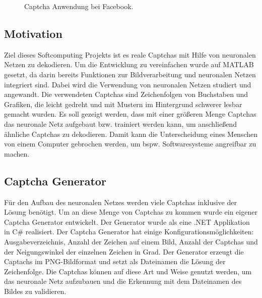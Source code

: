 \begin{figure}[htbp]
  \centering
  \caption{Captcha Anwendung bei Facebook.}
  \label{Captchas}
\end{figure}

\newpage

\subsection{Motivation}
Ziel dieses Softcomputing Projekts ist es reale Captchas mit Hilfe von neuronalen Netzen zu dekodieren. Um die Entwicklung zu vereinfachen wurde auf MATLAB gesetzt, da darin bereits Funktionen zur Bildverarbeitung und neuronalen Netzen integriert sind. Dabei wird die Verwendung von neuronalen Netzen studiert und angewandt. Die verwendeten Captchas sind Zeichenfolgen von Buchstaben und Grafiken, die leicht gedreht und mit Mustern im Hintergrund schwerer lesbar gemacht wurden. Es soll gezeigt werden, dass mit einer größeren Menge Captchas das neuronale Netz aufgebaut bzw. trainiert werden kann, um anschließend ähnliche Captchas zu dekodieren. Damit kann die Unterscheidung eines Menschen von einem Computer gebrochen werden, um bspw. Softwaresysteme angreifbar zu machen. 

\subsection{Captcha Generator}
Für den Aufbau des neuronalen Netzes werden viele Captchas inklusive der Lösung benötigt. Um an diese Menge von Captchas zu kommen wurde ein eigener Captcha Generator entwickelt. Der Generator wurde als eine .NET Applikation in C\# realisiert. Der Captcha Generator hat einige Konfigurationsmöglichkeiten: Ausgabeverzeichnis, Anzahl der Zeichen auf einem Bild, Anzahl der Captchas und der Neigungswinkel der einzelnen Zeichen in Grad. Der Generator erzeugt die Captachs im PNG-Bildformat und setzt als Dateinamen die Lösung der Zeichenfolge. Die Captchas können auf diese Art und Weise genutzt werden, um das neuronale Netz aufzubauen und die Erkennung mit dem Dateinamen des Bildes zu validieren.


